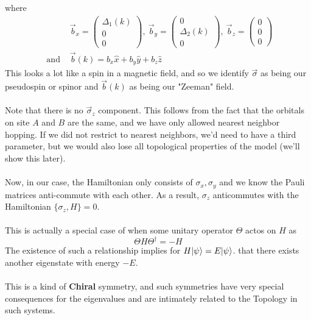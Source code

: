 \documentclass[11pt]{article}
\begin{document}
where \begin{align*}
  &\vec{b}_x = \begin{pmatrix}
    \Delta_1(k) \\ 0 \\ 0
  \end{pmatrix}, ~\vec{b}_y = \begin{pmatrix}
    0 \\ \Delta_2(k) \\ 0
  \end{pmatrix}, ~\vec{b}_z = \begin{pmatrix}
    0\\ 0 \\ 0
  \end{pmatrix} \\
  \text{ and }& \vec{b}(k) = b_x \hat{x} + b_y \hat{y} + b_z \hat{z}
\end{align*} This looks a lot like a spin in a magnetic field, and so we identify $\vec{\sigma}$ as being our pseudospin or spinor and $\vec{b}(k)$ as being our "Zeeman" field.
\\
\\
Note that there is no $\vec{\sigma}_z$ component. This follows from the fact that  the orbitals on site $A$ and $B$ are the same, and we have only allowed nearest neighbor hopping. If we did not restrict to nearest neighbors, we'd need to have a third parameter, but we would also lose all topological properties of the model (we'll show this later).
\\
\\
Now, in our case, the Hamiltonian only consists of $\sigma_x, \sigma_y$ and we know the Pauli matrices anti-commute with each other. As a result, $\sigma_z$ anticommutes with the Hamiltonian $\{\sigma_z, H\} = 0 $.
\\
\\
This is actually a special case of when some unitary operator $\Theta$ actos on $H$ as $$ \Theta H \Theta^{\dagger} = -H $$ The existence of such a relationship implies for $H \lvert\psi\rangle = E\lvert\psi\rangle$. that there exists another eigenstate with energy $-E$.  
\\
\\
This is a kind of \textbf{Chiral} symmetry, and such symmetries have very special consequences for the eigenvalues and are intimately related to the Topology in such systems.


\end{document}
